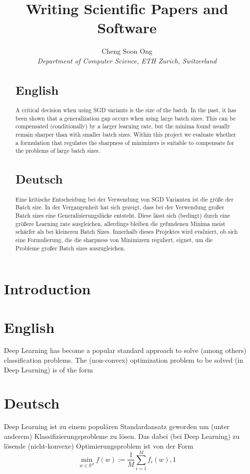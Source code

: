\documentclass[10pt,conference,compsocconf]{IEEEtran}
\begin{document}
\title{Writing Scientific Papers and Software}

\author{
  Cheng Soon Ong\\
  \textit{Department of Computer Science, ETH Zurich, Switzerland}
}

\maketitle

\begin{abstract}
\section*{English}
A critical decision when using SGD variants is the size of the batch. In the past, it has been shown that a generalization gap occurs when using large batch sizes. This can be compensated (conditionally) by a larger learning rate, but the minima found usually remain sharper than with smaller batch sizes. Within this project we evaluate whether a formulation that regulates the sharpness of minimizers is suitable to compensate for the problems of large batch sizes. 
\section*{Deutsch}
  Eine kritische Entscheidung bei der Verwendung von SGD Varianten ist die größe der Batch size. In der Vergangenheit hat sich gezeigt, dass bei der Verwendung großer Batch sizes eine Generalisierungslücke entsteht. Diese lässt sich (bedingt) durch eine größere Learning rate ausgleichen, allerdings bleiben die gefundenen Minima meist schärfer als bei kleineren Batch Sizes. Innerhalb dieses Projektes wird evaluiert, ob sich eine Formulierung, die die sharpness von Minimizern reguliert, eignet, um die Probleme großer Batch sizes auszugleichen. 
\end{abstract}

\section{Introduction}
\section*{English}
Deep Learning has become a popular standard approach to solve (among others) classification problems. 
The (non-convex) optimization problem to be solved (in Deep Learning) is of the form 
\section*{Deutsch}
Deep Learning ist zu einem populären Standardansatz geworden um (unter anderem) Klassifizierungsprobleme zu lösen. 
Das dabei (bei Deep Learning) zu lösende (nicht-konvexe) Optimierungsproblem ist von der Form 
\begin{equation}
\min_{w \in \mathbb{R}^d}{f(w) := \frac{1}{M} \sum_{i = 1}^M{f_i(w)}},1
\end{equation}
\end{document}
